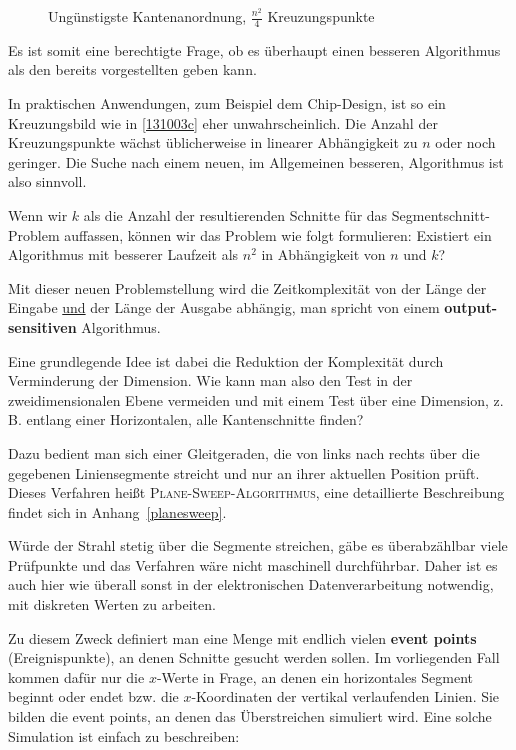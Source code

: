 \documentclass[ngerman]{scrreprt}%
\theoremstyle{break}
\begin{document}
\begin{figure}
  \centering
  \caption{Ungünstigste Kantenanordnung, $\frac{n^2}{4}$ Kreuzungspunkte}
  \label{131003c}
\end{figure}

Es ist somit eine berechtigte Frage, ob es überhaupt einen besseren
Algorithmus als den bereits vorgestellten geben kann.

In praktischen Anwendungen, zum Beispiel dem Chip-Design, ist so ein
Kreuzungsbild wie in \autoref{131003c} eher unwahrscheinlich. Die
Anzahl der Kreuzungspunkte wächst üblicherweise in linearer
Abhängigkeit zu $n$ oder noch geringer. Die Suche nach einem neuen, im
Allgemeinen besseren, Algorithmus ist also sinnvoll.

Wenn wir $k$ als die Anzahl der resultierenden Schnitte für das
Segmentschnitt-Problem auffassen, können wir das Problem wie folgt
formulieren: Existiert ein Algorithmus mit besserer Laufzeit als $n^2$ in 
Abhängigkeit von $n$ und $k$?

Mit dieser neuen Problemstellung wird die Zeitkomplexität von der Länge
der Eingabe \underline{und} der Länge der Ausgabe abhängig, man spricht
von einem \textbf{output-sensitiven} Algorithmus.

Eine grundlegende Idee ist dabei die Reduktion der Komplexität durch
Verminderung der Dimension. Wie kann man also den Test in der
zweidimensionalen Ebene vermeiden und mit einem Test über eine
Dimension, z.\,B. entlang einer Horizontalen, alle Kantenschnitte
finden?

Dazu bedient man sich einer Gleitgeraden, die von links nach rechts
über die gegebenen Liniensegmente streicht und nur an ihrer aktuellen
Position prüft. Dieses Verfahren heißt \textsc{Plane-Sweep-Algorithmus},
eine detaillierte Beschreibung findet sich in Anhang~\autoref{planesweep}.

Würde der Strahl stetig über die Segmente streichen, gäbe es
überabzählbar viele Prüfpunkte und das Verfahren wäre nicht maschinell
durchführbar. Daher ist es auch hier wie überall sonst in der
elektronischen Datenverarbeitung notwendig, mit diskreten Werten zu
arbeiten.
 
Zu diesem Zweck definiert man eine Menge mit endlich vielen \textbf{event
points} (Ereignispunkte), an denen Schnitte gesucht werden sollen. Im
vorliegenden Fall kommen dafür nur die $x$-Werte in Frage, an denen ein
horizontales Segment beginnt oder endet bzw. die $x$-Koordinaten der
vertikal verlaufenden Linien. Sie bilden die event points, an denen das
Überstreichen simuliert wird. Eine solche Simulation ist einfach zu
beschreiben:
\end{document}
